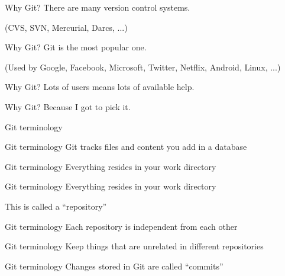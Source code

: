 \documentclass{beamer}
\begin{document}
\begin{frame}{Why Git?}
  \center
  \Huge There are many version control systems.
  \pause

  \huge (CVS, SVN, Mercurial, Darcs, ...)
\end{frame}

\begin{frame}{Why Git?}
  \center
  \Huge Git is the most popular one.
  \pause

  \large (Used by Google, Facebook, Microsoft, Twitter, Netflix, Android, Linux, ...)
\end{frame}

\begin{frame}{Why Git?}
  \center
  \Huge Lots of users means lots of available help.
\end{frame}

\begin{frame}{Why Git?}
  \center
  \Huge Because I got to pick it.
\end{frame}

\begin{frame}{}
  \center
  \Huge Git terminology
\end{frame}

\begin{frame}{Git terminology}
  \center
  \Huge Git tracks files and content you add in a database
\end{frame}

\begin{frame}{Git terminology}
  \center
  \Huge Everything resides in your work directory
\end{frame}

\begin{frame}{Git terminology}
  \center
  \Huge Everything resides in your work directory

  \huge This is called a ``repository''
\end{frame}

\begin{frame}{Git terminology}
  \center
  \Huge Each repository is independent from each other
\end{frame}

\begin{frame}{Git terminology}
  \center
  \Huge Keep things that are unrelated in different repositories
\end{frame}

\begin{frame}{Git terminology}
  \center
  \Huge Changes stored in Git are called ``commits''
\end{frame}
\end{document}
